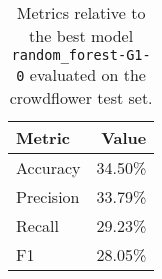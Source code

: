 \begin{table}[H]
\centering
\begin{tabularx}{0.48\textwidth}{|X|r|}
\hline
Metric & Value \\
\hline
Accuracy & 34.50\% \\
Precision & 33.79\% \\
Recall & 29.23\% \\
F1 & 28.05\% \\
\hline
\end{tabularx}
\caption{Metrics relative to the best model \texttt{random\_forest-G1-0} evaluated on the crowdflower test set.}
\label{tab:best_model_metrics_crowdflower_test}

\end{table}
